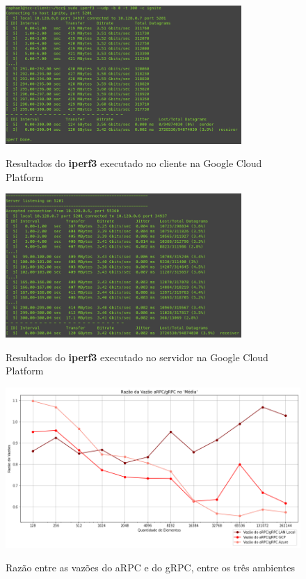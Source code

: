 \begin{figure}[ht]
    \centering
    \caption{Resultados do \textbf{iperf3} executado no cliente na Google Cloud Platform}
    \includegraphics[width=0.8\textwidth]{figuras/transporte/iperf_client_gcp.png} 
    \label{fig:iperf_client_gcp}
\end{figure}

\begin{figure}[!ht]
    \centering
    \caption{Resultados do \textbf{iperf3} executado no servidor na Google Cloud Platform}
    \includegraphics[width=0.8\textwidth]{figuras/transporte/iperf_server_gcp.png} 
    \label{fig:iperf_server_gcp}
\end{figure}

\begin{figure}[ht]
    \centering
    \caption{Razão entre as vazões do aRPC e do gRPC, entre os três ambientes}
    \includegraphics[width=\textwidth]{figuras/transporte/comparação_lan_azure_gcp.png} 
    \label{fig:comparação_lan_azure_gcp}
\end{figure}

